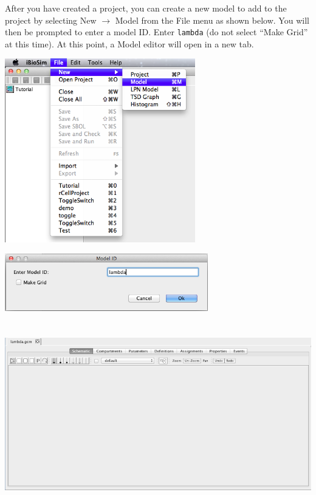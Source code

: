 \documentclass[titlepage,11pt]{article}
\begin{document}
\noindent
After you have created a project, you can create a new model to add to the project by selecting New $\rightarrow$ Model from the File menu as shown below. You will then be prompted to enter a model ID.  Enter {\tt lambda} (do not select ``Make Grid'' at this time).  At this point, a Model editor will open in a new tab.

\begin{center}
\includegraphics[height=80mm]{screenshots/newModel}
\end{center}

\begin{center}
\includegraphics[height=25mm]{screenshots/ModelId}
\end{center}

\begin{center}
\includegraphics[height=80mm]{screenshots/ModelEditor}
\end{center}
\end{document}
